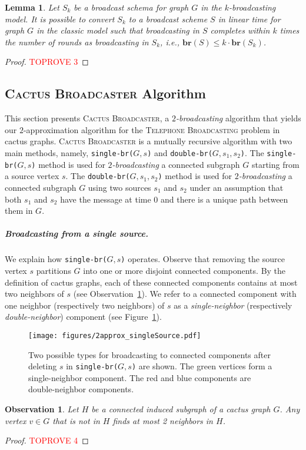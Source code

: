 \documentclass[letterpaper,11pt]{article}
\newtheorem{observation}{Observation}[section]
\newtheorem{lemma}[theorem]{Lemma}
\newcommand{\fast}{\textit{$k$-broadcasting}\xspace}
\newcommand{\twofast}{\textit{$2$-broadcasting}\xspace}
\newcommand{\br}{\boldsymbol{br}}
\newcommand{\telebr}{\textsc{Telephone Broadcasting}\xspace}
\newcommand{\singlefunc}[1]{\texttt{single-br(#1)}\xspace}
\newcommand{\doublefunc}[1]{\texttt{double-br(#1)}\xspace}
\newcommand{\ouralgo}{\textsc{Cactus Broadcaster}\xspace}
\newcommand{\figcomponent}{
    \begin{figure}
	\centering
	\texttt{[image: figures/2approx\_singleSource.pdf]}
	\caption{Two possible types for broadcasting to connected components after deleting $s$ in \singlefunc{$G,s$} are shown. The green vertices form a single-neighbor component. The red and blue components are double-neighbor components.}
    \label{fig:2approxSingleSource}

\end{figure}
}
\begin{document}
\begin{lemma} \label{lemma:2approx2calls}
Let $S_k$ be a 
broadcast schema for graph $G$ in the \fast model. It is possible to convert $S_k$ to a broadcast scheme $S$ in linear time for graph $G$ in the classic model such that broadcasting in $S$ completes within $k$ times the number of rounds as broadcasting in $S_k$, i.e., $\br(S) \leq k\cdot \br(S_k)$. 
\end{lemma}
\begin{proof}\textcolor{red}{TOPROVE 3}\end{proof}


\subsection{\ouralgo Algorithm}
This section presents \ouralgo, a \twofast algorithm 
that yields our $2$-approximation algorithm for the \telebr problem in cactus graphs. 
\ouralgo is a mutually recursive algorithm with two main methods, namely, 
    \singlefunc{$G, s$} and
    \doublefunc{$G, s_1, s_2$}.
The \singlefunc{$G, s$} method is used for \twofast a connected subgraph $G$ starting from a source vertex $s$. The \doublefunc{$G, s_1, s_2$} method is used for \twofast a connected subgraph $G$ using two sources $s_1$ and $s_2$ under an assumption that both $s_1$ and $s_2$ have the message at time $0$ and there is a unique path between them in $G$.  


\subparagraph*{Broadcasting from a single source.}
We explain how \singlefunc{$G, s$} operates. Observe that removing the source vertex $s$ partitions $G$ into one or more disjoint connected components. By the definition of cactus graphs, each of these connected components contains at most two neighbors of $s$ 
(see Observation~\ref{observation:two-neighbors}). We refer to a connected component with one neighbor (respectively two neighbors) of $s$ as a \emph{single-neighbor} (respectively \emph{double-neighbor}) component (see Figure~\ref{fig:2approxSingleSource}).

\figcomponent

\begin{observation}
\label{observation:two-neighbors}
Let $H$ be a connected induced subgraph of a cactus graph $G$. Any vertex $v \in G$ that is not in $H$ finds at most 2 neighbors in $H$.
\end{observation}
\begin{proof}\textcolor{red}{TOPROVE 4}\end{proof}
\end{document}
